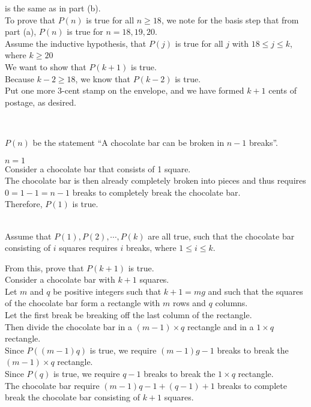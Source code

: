 \documentclass[12pt]{article}  %
\begin{document}
\begin{enumerate}
     is the same as in part (b).\\
    To prove that $P(n)$ is true for all $n\geq18$, we note for the basis step that from part (a), $P(n)$ is true for $n=18,19,20$.\\
    Assume the inductive hypothesis, that $P(j)$ is true for all $j$ with $18\leq j\leq k$, where $k\geq20$\\
    We want to show that $P(k+1)$ is true.\\
    Because $k-2\geq18$, we know that $P(k-2)$ is true.\\
    Put one more 3-cent stamp on the envelope, and we have formed $k+1$ cents of postage, as desired.
\end{enumerate}

\clearpage
{}\\

 $P(n)$ be the statement ``A chocolate bar can be broken in $n-1$ breaks''.

 $n=1$\\
Consider a chocolate bar that consists of 1 square.\\
The chocolate bar is then already completely broken into pieces and thus requires $0=1-1=n-1$ breaks to completely break the chocolate bar.\\
Therefore, $P(1)$ is true.

\\
Assume that $P(1),P(2),\cdots,P(k)$ are all true, such that the chocolate bar consisting of $i$ squares requires $i$ breaks, where $1\leq i\leq k$.

\noindent From this, prove that $P(k+1)$ is true.\\
Consider a chocolate bar with $k+1$ squares.\\
Let $m$ and $q$ be positive integers such that $k+1=mg$ and such that the squares of the chocolate bar form a rectangle with $m$ rows and $q$ columns.\\
Let the first break be breaking off the last column of the rectangle.\\
Then divide the chocolate bar in a $(m-1)\times q$ rectangle and in a $1\times q$ rectangle.\\
Since $P((m-1)q)$ is true, we require $(m-1)g-1$ breaks to break the $(m-1)\times q$ rectangle.\\
Since $P(q)$ is true, we require $q-1$ breaks to break the $1\times q$ rectangle.\\
The chocolate bar require $(m-1)q-1+(q-1)+1$ breaks to complete break the chocolate bar consisting of $k+1$ squares.
\end{document}
